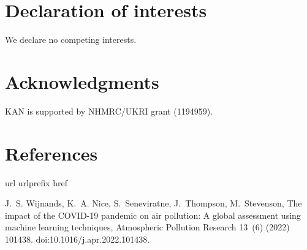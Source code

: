\documentclass[preprint,12pt]{elsarticle}
\begin{document}
\section*{Declaration of interests}\label{sec:dec}
We declare no competing interests.

\section*{Acknowledgments}\label{sec:ak}
KAN is supported by NHMRC/UKRI grant (1194959).








\section*{References}\label{sec:ref}




 
%
\begin{thebibliography}{1}
\expandafter\ifx\csname url\endcsname\relax
  \def\url#1{\texttt{#1}}\fi
\expandafter\ifx\csname urlprefix\endcsname\relax\def\urlprefix{URL }\fi
\expandafter\ifx\csname href\endcsname\relax
  \def\href#1#2{#2} \def\path#1{#1}\fi


J.~S. Wijnands, K.~A. Nice, S.~Seneviratne, J.~Thompson, M.~Stevenson,
  \href{https://doi.org/10.1016/j.apr.2022.101438}{{The impact of the COVID-19
  pandemic on air pollution: A global assessment using machine learning
  techniques}}, Atmospheric Pollution Research 13~(6) (2022) 101438.
\newblock \href {https://doi.org/10.1016/j.apr.2022.101438}
  {\path{doi:10.1016/j.apr.2022.101438}}.


\end{thebibliography}
\end{document}
